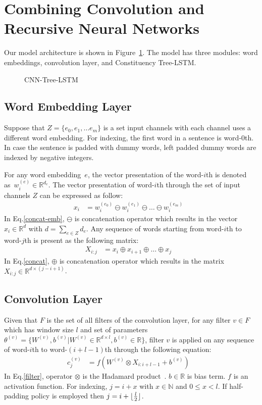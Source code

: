 \section{Combining Convolution and Recursive Neural Networks}\label{sec:cnn-treelstm}
Our model architecture is shown in Figure~\ref{fig:cnn-treelstm}.
The model has three modules: word embeddings, convolution layer, and Constituency Tree-LSTM.
\begin{figure} [H]
	\centering
	\label{fig:cnn-treelstm}
	\caption[qwerty]{CNN-Tree-LSTM}
\end{figure}
\subsection{Word Embedding Layer}
Suppose that \(Z = \{e_0, e_1, \ldots e_m\}\) is a set input channels with each channel uses a different word embedding.
For indexing, the first word in a sentence is word-\(0\)th.
In case the sentence is padded with dummy words, left padded dummy words are indexed by negative integers.

For any word embedding~\(e\), the vector presentation of the word-\(i\)th is denoted as~\(w^{(e)}_i \in \mathbb{R}^{d_e}\).
The vector presentation of word-\(i\)th through the set of input channels \(Z\) can be expressed as follow:
\begin{align}
 x_i &= w^{(e_0)}_i \ominus w^{(e_1)}_i \ominus  \ldots \ominus w^{(e_m)}_i&\label{concat-emb}
\end{align}
In Eq.\eqref{concat-emb}, \(\ominus\) is concatenation operator which results in the vector \(x_i \in \mathbb{R}^{d}\) with \(d = \sum_{e \in Z} d_e\).
Any sequence of words starting from word-\(i\)th to word-\(j\)th is present as the following matrix:
\begin{align}
X_{i:j} &= x_i \oplus x_{i+1} \oplus \ldots \oplus x_j &\label{concat}
\end{align}
In Eq.\eqref{concat}, \(\oplus\) is concatenation operator which results in the matrix \(X_{i:j} \in \mathbb{R}^{d \times (j-i+1)}\).
\subsection{Convolution Layer}\label{sec:cnn}
Given that \(F\) is the set of all filters of the convolution layer, for any filter \(v \in F\) which has window size \(l\) and set of parameters \(\theta^{(v)} = \{ W^{(v)}, b^{(v)} | W^{(v)} \in \mathbb{R}^{d \times l}, b^{(v)} \in \mathbb{R}\}\), filter \({v}\) is applied on any sequence of word-\(i\)th to word-\((i+l-1)\)th through the following equation:
\begin{align}
c^{(v)}_j &= f(W^{(v)} \otimes X_{i:i+l-1} + b^{(v)}) &\label{filter}
\end{align}
In Eq.\eqref{filter}, operator \(\otimes\) is the Hadamard product~\cite{element-prod}.
\(b \in \mathbb{R}\) is bias term. \(f\) is an activation function.
For indexing, \(j = i + x\) with \(x \in \mathbb{N}\) and \(0 \leq x < l\).
If half-padding policy is employed then \(j = i + \lfloor \frac{l}{2} \rfloor\).

